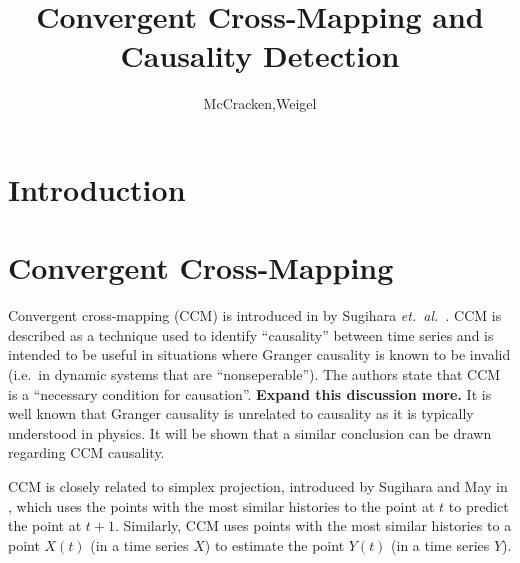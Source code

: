 \documentclass[a4paper,11pt]{article}
\title{Convergent Cross-Mapping and Causality Detection}
\author{McCracken,Weigel}
\begin{document}
\maketitle


\section{Introduction}
\section{Convergent Cross-Mapping}
Convergent cross-mapping (CCM) is introduced in \cite{mainref,suppref} by Sugihara {\em et.\ al.\ }.  CCM is described as a technique used to identify ``causality'' between time series and is intended to be useful in situations where Granger causality \cite{} is known to be invalid (i.e.\ in dynamic systems that are ``nonseperable'').  The authors state that CCM is a ``necessary condition for causation''.  {\bf Expand this discussion more.}  It is well known \cite{} that Granger causality is unrelated to causality as it is typically understood in physics.  It will be shown that a similar conclusion can be drawn regarding CCM causality. 

CCM is closely related to simplex projection, introduced by Sugihara and May in \cite{}, which uses the points with the most similar histories to the point at $t$ to predict the point at $t+1$.  Similarly, CCM uses points with the most similar histories to a point $X(t)$ (in a time series $X$) to estimate the point $Y(t)$ (in a time series $Y$).
\end{document}
